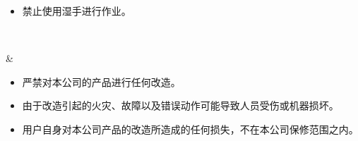 \documentclass[a4paper,11pt,english,openany,oneside]{sphinxmanual}
\begin{document}
\begin{savenotes}
\begin{tabular}[t]{}
\begin{varwidth}[t]{}
\begin{itemize}
\item {} 
\sphinxAtStartPar
禁止使用湿手进行作业。

\end{itemize}
\sphinxbeforeendvarwidth
\end{varwidth}%
\\
\sphinxhline\begin{varwidth}[t]{}

\noindent{}
\sphinxbeforeendvarwidth
\end{varwidth}%
&\begin{varwidth}[t]{}
\sphinxAtStartPar
{}
\begin{itemize}
\item {} 
\sphinxAtStartPar
严禁对本公司的产品进行任何改造。

\item {} 
\sphinxAtStartPar
由于改造引起的火灾、故障以及错误动作可能导致人员受伤或机器损坏。

\item {} 
\sphinxAtStartPar
用户自身对本公司产品的改造所造成的任何损失，不在本公司保修范围之内。

\end{itemize}
\sphinxbeforeendvarwidth
\end{varwidth}%
\\
\sphinxbottomrule
\end{tabular}
\sphinxtableafterendhook\par
\sphinxattableend\end{savenotes}
\end{document}
